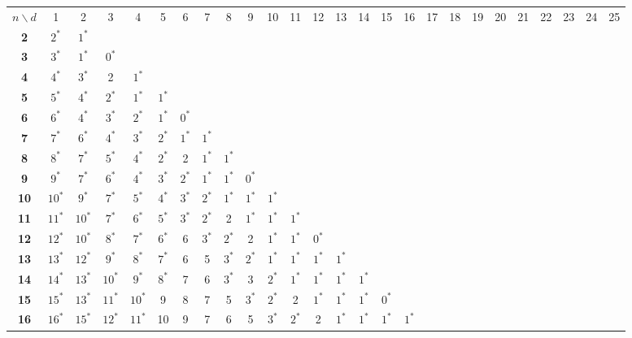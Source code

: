 
\begin{table}
\smaller[2]
\centering
\setlength{\tabcolsep}{4.5pt}
\begin{tabular}{|c| c c c c c c c c c c c c c c c c c c c c c c c c c |}
\hline
$n \backslash  d$ & 1 & 2 & 3 & 4 & 5 & 6 & 7 & 8 & 9 & 10 & 11 & 12 & 13 & 14 & 15 & 16 & 17 & 18 & 19 & 20 & 21 & 22 & 23 & 24 & 25 \\
\Xhline{4\arrayrulewidth}
\textbf{2} & $2^*$ & $1^*$ & & & & & & & & & & & & & & & & & & & & & & & \\
\textbf{3} & $3^*$ & $1^*$ & $0^*$ & & & & & & & & & & & & & & & & & & & & & & \\
\textbf{4} & $4^*$ & $3^*$ & 2 & $1^*$ & & & & & & & & & & & & & & & & & & & & & \\
\textbf{5} & $5^*$ & $4^*$ & $2^*$ & $1^*$ & $1^*$ & & & & & & & & & & & & & & & & & & & & \\
\textbf{6} & $6^*$ & $4^*$ & $3^*$ & $2^*$ & $1^*$ & $0^*$ & & & & & & & & & & & & & & & & & & & \\
\textbf{7} & $7^*$ & $6^*$ & $4^*$ & $3^*$ & $2^*$ & $1^*$ & $1^*$ & & & & & & & & & & & & & & & & & & \\
\textbf{8} & $8^*$ & $7^*$ & $5^*$ & $4^*$ & $2^*$ & 2 & $1^*$ & $1^*$ & & & & & & & & & & & & & & & & & \\
\textbf{9} & $9^*$ & $7^*$ & $6^*$ & $4^*$ & $3^*$ & $2^*$ & $1^*$ & $1^*$ & $0^*$ & & & & & & & & & & & & & & & & \\
\textbf{10} & $10^*$ & $9^*$ & $7^*$ & $5^*$ & $4^*$ & $3^*$ & $2^*$ & $1^*$ & $1^*$ & $1^*$ & & & & & & & & & & & & & & & \\
\textbf{11} & $11^*$ & $10^*$ & $7^*$ & $6^*$ & $5^*$ & $3^*$ & $2^*$ & 2 & $1^*$ & $1^*$ & $1^*$ & & & & & & & & & & & & & & \\
\textbf{12} & $12^*$ & $10^*$ & $8^*$ & $7^*$ & $6^*$ & 6 & $3^*$ & $2^*$ & 2 & $1^*$ & $1^*$ & $0^*$ & & & & & & & & & & & & & \\
\textbf{13} & $13^*$ & $12^*$ & $9^*$ & $8^*$ & $7^*$ & 6 & 5 & $3^*$ & $2^*$ & $1^*$ & $1^*$ & $1^*$ & $1^*$ & & & & & & & & & & & & \\
\textbf{14} & $14^*$ & $13^*$ & $10^*$ & $9^*$ & $8^*$ & 7 & 6 & $3^*$ & 3 & $2^*$ & $1^*$ & $1^*$ & $1^*$ & $1^*$ & & & & & & & & & & & \\
\textbf{15} & $15^*$ & $13^*$ & $11^*$ & $10^*$ & 9 & 8 & 7 & 5 & $3^*$ & $2^*$ & 2 & $1^*$ & $1^*$ & $1^*$ & $0^*$ & & & & & & & & & & \\
\textbf{16} & $16^*$ & $15^*$ & $12^*$ & $11^*$ & 10 & 9 & 7 & 6 & 5 & $3^*$ & $2^*$ & 2 & $1^*$ & $1^*$ & $1^*$ & $1^*$ & & & & & & & & & \\

\end{tabular}
\end{table}
